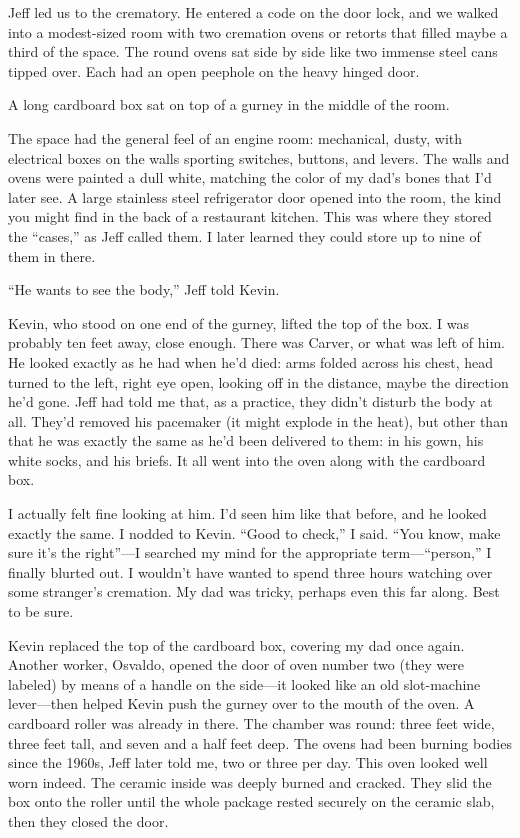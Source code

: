 \documentclass[12pt]{book}
\begin{document}
Jeff led us to the crematory. He entered a code on the door lock, and we walked into a modest-sized room with two cremation ovens or retorts that filled maybe a third of the space. The round ovens sat side by side like two immense steel cans tipped over. Each had an open peephole on the heavy hinged door.

A long cardboard box sat on top of a gurney in the middle of the room.

The space had the general feel of an engine room: mechanical, dusty, with electrical boxes on the walls sporting switches, buttons, and levers. The walls and ovens were painted a dull white, matching the color of my dad's bones that I'd later see. A large stainless steel refrigerator door opened into the room, the kind you might find in the back of a restaurant kitchen. This was where they stored the ``cases,'' as Jeff called them. I later learned they could store up to nine of them in there.

``He wants to see the body,'' Jeff told Kevin.

Kevin, who stood on one end of the gurney, lifted the top of the box. I was probably ten feet away, close enough. There was Carver, or what was left of him. He looked exactly as he had when he'd died: arms folded across his chest, head turned to the left, right eye open, looking off in the distance, maybe the direction he'd gone. Jeff had told me that, as a practice, they didn't disturb the body at all. They'd removed his pacemaker (it might explode in the heat), but other than that he was exactly the same as he'd been delivered to them: in his gown, his white socks, and his briefs. It all went into the oven along with the cardboard box.

I actually felt fine looking at him. I'd seen him like that before, and he looked exactly the same. I nodded to Kevin. ``Good to check,'' I said. ``You know, make sure it's the right''---I searched my mind for the appropriate term---``person,'' I finally blurted out. I wouldn't have wanted to spend three hours watching over some stranger's cremation. My dad was tricky, perhaps even this far along. Best to be sure.

Kevin replaced the top of the cardboard box, covering my dad once again. Another worker, Osvaldo, opened the door of oven number two (they were labeled) by means of a handle on the side---it looked like an old slot-machine lever---then helped Kevin push the gurney over to the mouth of the oven. A cardboard roller was already in there. The chamber was round: three feet wide, three feet tall, and seven and a half feet deep. The ovens had been burning bodies since the 1960s, Jeff later told me, two or three per day. This oven looked well worn indeed. The ceramic inside was deeply burned and cracked. They slid the box onto the roller until the whole package rested securely on the ceramic slab, then they closed the door.
\end{document}
